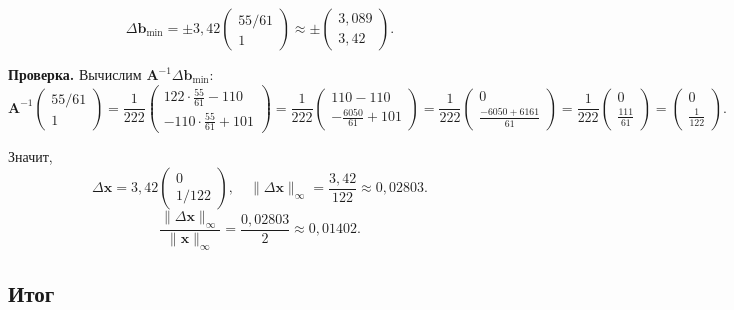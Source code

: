 \documentclass{article}
\begin{document}
\begin{equation}
\Delta\mathbf{b}_{\min} = \pm 3{,}42 \begin{pmatrix} 55/61 \\ 1 \end{pmatrix} \approx \pm \begin{pmatrix} 3{,}089 \\ 3{,}42 \end{pmatrix}.
\end{equation}

\textbf{Проверка.} Вычислим $\mathbf{A}^{-1}\Delta\mathbf{b}_{\min}$:
\begin{equation}
\mathbf{A}^{-1} \begin{pmatrix} 55/61 \\ 1 \end{pmatrix} = \frac{1}{222} \begin{pmatrix} 122 \cdot \frac{55}{61} - 110 \\ -110 \cdot \frac{55}{61} + 101 \end{pmatrix} = \frac{1}{222} \begin{pmatrix} 110 - 110 \\ -\frac{6050}{61} + 101 \end{pmatrix} = \frac{1}{222} \begin{pmatrix} 0 \\ \frac{-6050 + 6161}{61} \end{pmatrix} = \frac{1}{222} \begin{pmatrix} 0 \\ \frac{111}{61} \end{pmatrix} = \begin{pmatrix} 0 \\ \frac{1}{122} \end{pmatrix}.
\end{equation}

Значит,
\begin{equation}
\Delta\mathbf{x} = 3{,}42 \begin{pmatrix} 0 \\ 1/122 \end{pmatrix}, \quad \|\Delta\mathbf{x}\|_\infty = \frac{3{,}42}{122} \approx 0{,}02803.
\end{equation}
\begin{equation}
\frac{\|\Delta\mathbf{x}\|_\infty}{\|\mathbf{x}\|_\infty} = \frac{0{,}02803}{2} \approx 0{,}01402.
\end{equation}

\subsection*{Итог}
\end{document}
